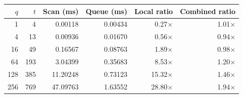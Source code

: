 \begin{tabular}{@{}rrrrrr@{}}
\toprule
$q$ & $t$ & Scan (ms) & Queue (ms) & Local ratio & Combined ratio\\
\midrule
1 & 4 & 0.00118 & 0.00434 & 0.27$\times$ & 1.01$\times$\\
4 & 13 & 0.00936 & 0.01670 & 0.56$\times$ & 0.94$\times$\\
16 & 49 & 0.16567 & 0.08763 & 1.89$\times$ & 0.98$\times$\\
64 & 193 & 3.04399 & 0.35683 & 8.53$\times$ & 1.20$\times$\\
128 & 385 & 11.20248 & 0.73123 & 15.32$\times$ & 1.46$\times$\\
256 & 769 & 47.09763 & 1.63552 & 28.80$\times$ & 1.94$\times$\\
\bottomrule
\end{tabular}
